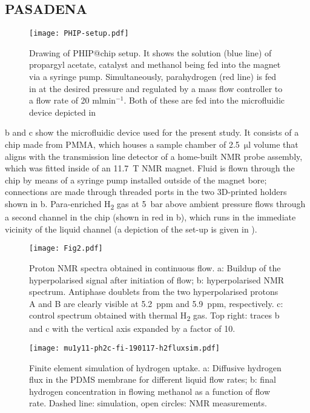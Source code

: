 \subsection{PASADENA}

\begin{figure}
  \begin{center}
  \texttt{[image: PHIP-setup.pdf]}
  \end{center}
  \caption{Drawing of PHIP@chip setup. It shows the solution (blue line)
  of propargyl acetate, catalyst and methanol being fed into the magnet
  via a syringe pump. Simultaneously, parahydrogen (red line) is fed in
  at the desired pressure and regulated by a mass flow controller to a
  flow rate of 20 ml$\text{min}^{-1}$. Both of these are fed into the
  microfluidic device depicted in }
  \label{fig:SetUp}
\end{figure}

b and c show the microfluidic device used for the
present study. It consists of a chip made from PMMA, which houses a sample
chamber of 2.5~$\mathrm{\mu l}$ volume that aligns with the transmission line
detector of a home-built NMR probe assembly, which was fitted inside of an
11.7~T NMR magnet.  Fluid is flown through the chip by means of a syringe pump
installed outside of the magnet bore; connections are made through threaded
ports in the two 3D-printed holders shown in b.
Para-enriched H\textsubscript{2} gas at 5~bar above ambient pressure flows
through a second
channel in the chip (shown in red in b), which runs in
the immediate vicinity of the liquid channel
(a depiction of the set-up is given in ).


\begin{figure*}[t]
	\centering
	\texttt{[image: Fig2.pdf]}
	\caption{Proton NMR spectra obtained in continuous flow.
	a: Buildup of the hyperpolarised signal after initiation of flow;
	b: hyperpolarised NMR spectrum. Antiphase doublets from the two
	hyperpolarised protons A and B are clearly visible at 5.2~ppm and
	5.9~ppm, respectively.
	c: control spectrum obtained with thermal H\textsubscript{2} gas.
  Top right: traces b and c with the vertical axis expanded by a factor
  of 10.
	}
	\label{fig:phip@chip2}
\end{figure*}

\begin{figure}
  \begin{center}
	\texttt{[image: mu1y11-ph2c-fi-190117-h2fluxsim.pdf]}
  \end{center}
	\caption{
		Finite element simulation of hydrogen uptake. a: Diffusive hydrogen
		flux in the PDMS membrane for different liquid flow rates;
		b: final hydrogen concentration in flowing methanol as a function of
		flow rate. Dashed line: simulation, open circles: NMR measurements.
	}
	\label{fig:h2fluxsim}
\end{figure}


